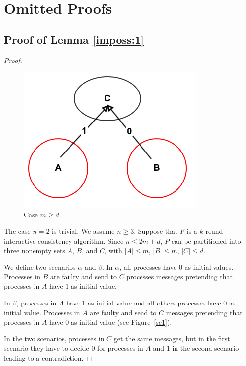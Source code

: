
\section{Omitted Proofs}

\subsection{Proof of Lemma \ref{imposs:1}} \label{app:imposs:1}
\begin{proof}
\begin{figure}[h]
  \centering
  \includegraphics[scale=0.35]{impossible1.png}
  \caption{Case $m \geqslant d$  }
\end{figure}\label{sc1}

  The case $n=2$ is trivial. We assume $n \geqslant 3$.
  Suppose that $F$ is a $k$-round interactive consistency algorithm. Since $n \leqslant
  2m+d$, $P$ can be partitioned into three nonempty sets $A$, $B$, and $C$,
  with $| A | \leqslant m$, $| B | \leqslant m$, $| C | \leqslant d$. 
  
  We define two scenarios $\alpha$ and $\beta$.
  In $\alpha$, all processes have 0 as initial values.
  Processes in $B$ are faulty and send  to $C$ processes messages
  pretending that processes in $A$ have 1 as initial value.
  
   In $\beta$, processes in $A$ have 1 as initial value and all  others processes have 0 as initial value.
  Processes in $A$ are faulty and send to $C$ messages 
  pretending that processes in $A$ have 0 as initial value (see Figure~\ref{sc1}).
  
  In the two scenarios, processes in $C$ get the same messages, but in the first scenario 
  they have to decide 0 for processes in $A$ and $1$ in the second scenario leading to a contradiction.
    

\end{proof}
